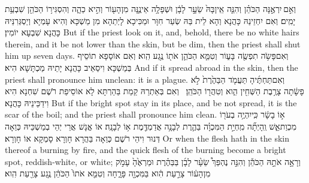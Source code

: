 {וְאִ֣ם \legarmeh  יִרְאֶ֣נָּה הַכֹּהֵ֗ן וְהִנֵּ֤ה אֵֽין\maqqaf בָּהּ֙ שֵׂעָ֣ר לָבָ֔ן וּשְׁפָלָ֥ה אֵינֶ֛נָּה מִן\maqqaf הָע֖וֹר וְהִ֣יא כֵהָ֑ה וְהִסְגִּיר֥וֹ הַכֹּהֵ֖ן שִׁבְעַ֥ת יָמִֽים׃}
{וְאִם יִחְזֵינַהּ כָּהֲנָא וְהָא לֵית בַּהּ שְׂעַר חִוָּר וּמַכִּיכָא לָיְתַהָא מִן מַשְׁכָּא וְהִיא עָמְיָא וְיַסְגְּרִנֵּיהּ כָּהֲנָא שִׁבְעָא יוֹמִין׃}
{But if the priest look on it, and, behold, there be no white hairs therein, and it be not lower than the skin, but be dim, then the priest shall shut him up seven days.}{}
{וְאִם\maqqaf פָּשֹׂ֥ה תִפְשֶׂ֖ה בָּע֑וֹר וְטִמֵּ֧א הַכֹּהֵ֛ן אֹת֖וֹ נֶ֥גַע הִֽוא׃}
{וְאִם אוֹסָפָא תוֹסֵיף בְּמַשְׁכָּא וִיסַאֵיב כָּהֲנָא יָתֵיהּ מַכְתָּשָׁא הִיא׃}
{And if it spread abroad in the skin, then the priest shall pronounce him unclean: it is a plague.}{}
{וְאִם\maqqaf תַּחְתֶּ֜יהָ תַּעֲמֹ֤ד הַבַּהֶ֙רֶת֙ לֹ֣א פָשָׂ֔תָה צָרֶ֥בֶת הַשְּׁחִ֖ין הִ֑וא וְטִהֲר֖וֹ הַכֹּהֵֽן׃ \setuma }
{וְאִם בְּאַתְרַהּ קַמַת בַּהַרְתָּא לָא אוֹסֵיפַת רֹשֶׁם שִׁחְנָא הִיא וִידַכֵּינֵיהּ כָּהֲנָא׃}
{But if the bright spot stay in its place, and be not spread, it is the scar of the boil; and the priest shall pronounce him clean.}{}
{א֣וֹ בָשָׂ֔ר כִּֽי\maqqaf יִהְיֶ֥ה בְעֹר֖וֹ מִכְוַת\maqqaf אֵ֑שׁ וְֽהָיְתָ֞ה מִֽחְיַ֣ת הַמִּכְוָ֗ה בַּהֶ֛רֶת לְבָנָ֥ה אֲדַמְדֶּ֖מֶת א֥וֹ לְבָנָֽה׃}
{אוֹ אֱנָשׁ אֲרֵי יְהֵי בְמַשְׁכֵּיהּ כְּוַאָה דְּנוּר וִיהֵי רֹשֶׁם כְּוַאָה בַּהֲרָא חָוְרָא סָמְקָא אוֹ חָוְרָא׃}
{Or when the flesh hath in the skin thereof a burning by fire, and the quick flesh of the burning become a bright spot, reddish-white, or white;}{}
{וְרָאָ֣ה אֹתָ֣הּ הַכֹּהֵ֡ן וְהִנֵּ֣ה נֶהְפַּךְ֩ שֵׂעָ֨ר לָבָ֜ן בַּבַּהֶ֗רֶת וּמַרְאֶ֙הָ֙ עָמֹ֣ק מִן\maqqaf הָע֔וֹר צָרַ֣עַת הִ֔וא בַּמִּכְוָ֖ה פָּרָ֑חָה וְטִמֵּ֤א אֹתוֹ֙ הַכֹּהֵ֔ן נֶ֥גַע צָרַ֖עַת הִֽוא׃}
